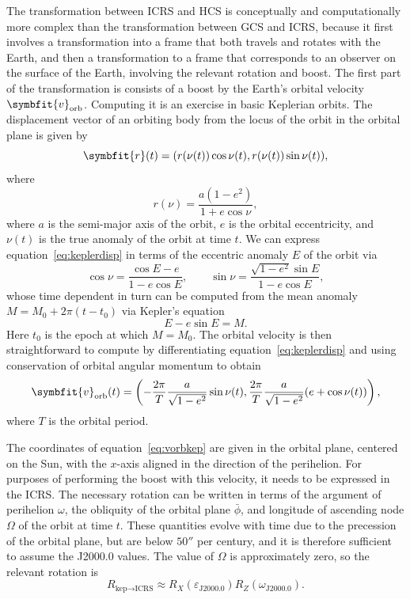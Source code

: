 \documentclass[b5paper, 10pt, twoside]{book}
\renewcommand{\vec}[1]{\symbfit{#1}}
\begin{document}
The transformation between ICRS and HCS is conceptually and computationally more complex than the transformation between GCS and ICRS, because it first involves a transformation into a frame that both travels and rotates with the Earth, and then a transformation to a frame that corresponds to an observer on the surface of the Earth, involving the relevant rotation and boost. The first part of the transformation is consists of a boost by the Earth's orbital velocity $\vec{v}_\text{orb}$. Computing it is an exercise in basic Keplerian orbits. The displacement vector of an orbiting body from the locus of the orbit in the orbital plane is given by
\begin{equation}
    \vec{r}(t)=(r(\nu(t))\cos\nu(t),r(\nu(t))\sin\nu(t)),
    \label{eq:keplerdisp}
\end{equation}
where
\begin{equation}
    r(\nu)=\frac{a(1-e^2)}{1+e\cos\nu},
\end{equation}
where $a$ is the semi-major axis of the orbit, $e$ is the orbital eccentricity, and $\nu(t)$ is the true anomaly of the orbit at time $t$. We can express equation~\eqref{eq:keplerdisp} in terms of the eccentric anomaly $E$ of the orbit via
\begin{equation}
    \cos\nu=\frac{\cos E-e}{1-e\cos E},\qquad\sin\nu=\frac{\sqrt{1-e^2}\sin E}{1-e\cos E},
\end{equation}
whose time dependent in turn can be computed from the mean anomaly $M=M_0+2\pi(t-t_0)$ via Kepler's equation
\begin{equation}
    E-e\sin E=M.
\end{equation}
Here $t_0$ is the epoch at which $M=M_0$. The orbital velocity is then straightforward to compute by differentiating equation~\eqref{eq:keplerdisp} and using conservation of orbital angular momentum to obtain
\begin{equation}
    \vec{v}_\text{orb}(t)=\left(-\frac{2\pi}{T}\frac{a}{\sqrt{1-e^2}}\sin\nu(t),\frac{2\pi}{T}\frac{a}{\sqrt{1-e^2}}(e+\cos\nu(t))\right),
    \label{eq:vorbkep}
\end{equation}
where $T$ is the orbital period.

The coordinates of equation~\eqref{eq:vorbkep} are given in the orbital plane, centered on the Sun, with the $x$-axis aligned in the direction of the perihelion. For purposes of performing the boost with this velocity, it needs to be expressed in the ICRS. The necessary rotation can be written in terms of the argument of perihelion $\omega$, the obliquity of the orbital plane $\bar{\phi}$, and longitude of ascending node $\Omega$ of the orbit at time $t$. These quantities evolve with time due to the precession of the orbital plane, but are below $50''$ per century, and it is therefore sufficient to assume the J2000.0 values. The value of $\Omega$ is approximately zero, so the relevant rotation is
\begin{equation}
    R_{\text{kep}\rightarrow\text{ICRS}}\approx R_X(\varepsilon_\text{J2000.0})R_Z(\omega_\text{J2000.0}).
\end{equation}
\end{document}
